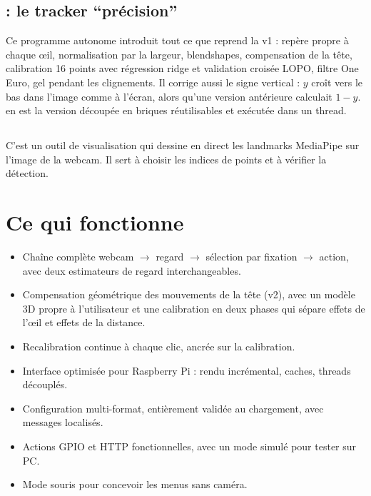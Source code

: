 \subsection{\texorpdfstring{}{test_xav.py} : le tracker \enquote{précision}}

Ce programme autonome introduit tout ce que reprend la v1 : repère propre à chaque œil, normalisation par la largeur, blendshapes, compensation de la tête, calibration 16 points avec régression ridge et validation croisée LOPO, filtre One Euro, gel pendant les clignements. Il corrige aussi le signe vertical : $y$ croît vers le bas dans l'image comme à l'écran, alors qu'une version antérieure calculait $1 - y$.  en est la version découpée en briques réutilisables et exécutée dans un thread.

\subsection{\texorpdfstring{}{landmarks_visu.py}}

C'est un outil de visualisation qui dessine en direct les landmarks MediaPipe sur l'image de la webcam. Il sert à choisir les indices de points et à vérifier la détection.

\section{Ce qui fonctionne}

\begin{itemize}
  \item Chaîne complète webcam $\to$ regard $\to$ sélection par fixation $\to$ action, avec deux estimateurs de regard interchangeables.
  \item Compensation géométrique des mouvements de la tête (v2), avec un modèle 3D propre à l'utilisateur et une calibration en deux phases qui sépare effets de l'œil et effets de la distance.
  \item Recalibration continue à chaque clic, ancrée sur la calibration.
  \item Interface optimisée pour Raspberry Pi : rendu incrémental, caches, threads découplés.
  \item Configuration multi-format, entièrement validée au chargement, avec messages localisés.
  \item Actions GPIO et HTTP fonctionnelles, avec un mode simulé pour tester sur PC.
  \item Mode souris pour concevoir les menus sans caméra.
\end{itemize}

